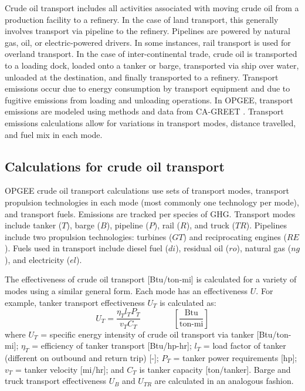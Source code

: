 \documentclass[11pt]{report}
\newcommand{\eqnunitfrac}[2]{\quad\quad \scriptstyle{\left[\frac{\text{#1}}{\text{#2}}\right]}}
\begin{document}
Crude oil transport includes all activities associated with moving crude oil from a production facility to a refinery. In the case of land transport, this generally involves transport via pipeline to the refinery. Pipelines are powered by natural gas, oil, or electric-powered drivers. In some instances, rail transport is used for overland transport. In the case of inter-continental trade, crude oil is transported to a loading dock, loaded onto a tanker or barge, transported via ship over water, unloaded at the destination, and finally transported to a refinery.
Transport emissions occur due to energy consumption by transport equipment and due to fugitive emissions from loading and unloading operations. In OPGEE, transport emissions are modeled using methods and data from CA-GREET \cite{Wang2009}. Transport emissions calculations allow for variations in transport modes, distance travelled, and fuel mix in each mode. 


\subsection{Calculations for crude oil transport}

OPGEE crude oil transport calculations use sets of transport modes, transport propulsion technologies in each mode (most commonly one technology per mode), and transport fuels. Emissions are tracked per species of GHG. Transport modes include tanker ($T$), barge ($B$), pipeline ($P$), rail ($R$), and truck ($TR$). Pipelines include two propulsion technologies: turbines ($GT$) and reciprocating engines ($RE$). Fuels used in transport include diesel fuel ($di$), residual oil ($ro$), natural gas ($ng$), and electricity ($el$). 

The effectiveness of crude oil transport [Btu/ton-mi] is calculated for a variety of modes using a similar general form. Each mode has an effectiveness $U$. For example, tanker transport effectiveness $U_{T}$ is calculated as:
\begin{equation}\label{eq:trans_ek}
U_T = \frac{\eta_T l_T P_T}{v_T C_T} \quad\quad\eqnunitfrac{Btu}{ton-mi}
\end{equation}
where $U_T$ = specific energy intensity of crude oil transport via tanker [Btu/ton-mi]; $\eta_T$ = efficiency of tanker transport [Btu/hp-hr]; $l_T$ = load factor of tanker (different on outbound and return trip) [-]; $P_T$ = tanker power requirements [hp]; $v_T$ = tanker velocity [mi/hr]; and $C_T$ is tanker capacity [ton/tanker]. Barge and truck transport effectiveness $U_{B}$ and $U_{TR}$ are calculated in an analogous fashion.
\end{document}

